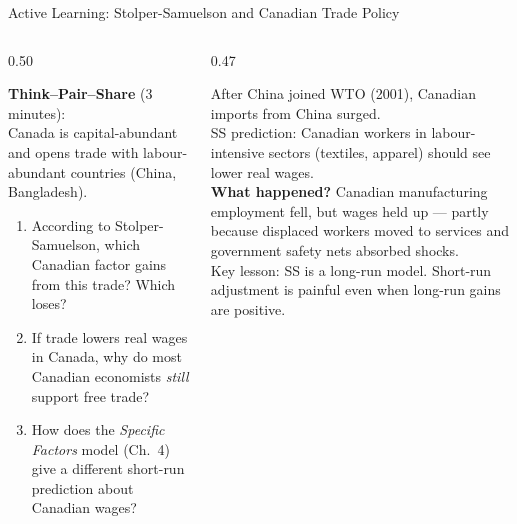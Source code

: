 \documentclass[aspectratio=169]{beamer}
\begin{document}
\begin{frame}{Active Learning: Stolper-Samuelson and Canadian Trade Policy}
\begin{columns}[T]
\begin{column}{0.50\textwidth}
\begin{discuss}
\small
\textbf{Think--Pair--Share} (3 minutes):\\[0.3em]
Canada is capital-abundant and opens trade with
labour-abundant countries (China, Bangladesh).
\begin{enumerate}
  \item According to Stolper-Samuelson, which
        Canadian factor gains from this trade? Which
        loses?
  \item If trade lowers real wages in Canada, why
        do most Canadian economists \emph{still}
        support free trade?
  \item How does the \emph{Specific Factors} model
        (Ch.~4) give a different short-run prediction
        about Canadian wages?
\end{enumerate}
\end{discuss}
\end{column}
\begin{column}{0.47\textwidth}
\begin{canadex}
\small
After China joined WTO (2001), Canadian imports
from China surged.\\[0.3em]
SS prediction: Canadian workers in
labour-intensive sectors (textiles, apparel)
should see lower real wages.\\[0.3em]
\textbf{What happened?} Canadian manufacturing
employment fell, but wages held up --- partly
because displaced workers moved to services and
government safety nets absorbed shocks.\\[0.3em]
Key lesson: SS is a long-run model. Short-run
adjustment is painful even when long-run gains
are positive.
\end{canadex}
\end{column}
\end{columns}
\end{frame}

\end{document}

